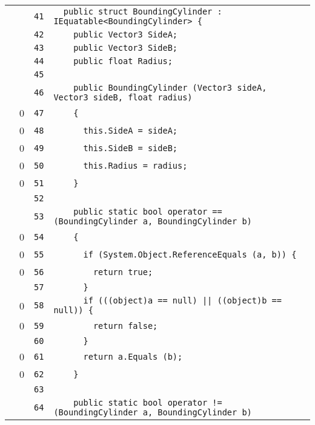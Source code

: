 \documentclass[a4paper,10pt]{article}
\begin{document}
\begin{longtable}[l]{lrrl}
\cellcolor{gray} &  & \verb~41~ & \verb~  public struct BoundingCylinder : IEquatable<BoundingCylinder> {~\\
\cellcolor{gray} &  & \verb~42~ & \verb~    public Vector3 SideA;~\\
\cellcolor{gray} &  & \verb~43~ & \verb~    public Vector3 SideB;~\\
\cellcolor{gray} &  & \verb~44~ & \verb~    public float Radius;~\\
\cellcolor{gray} &  & \verb~45~ & \verb~~\\
\cellcolor{gray} &  & \verb~46~ & \verb~    public BoundingCylinder (Vector3 sideA, Vector3 sideB, float radius)~\\
\cellcolor{red} & 0 & \verb~47~ & \verb~    {~\\
\cellcolor{red} & 0 & \verb~48~ & \verb~      this.SideA = sideA;~\\
\cellcolor{red} & 0 & \verb~49~ & \verb~      this.SideB = sideB;~\\
\cellcolor{red} & 0 & \verb~50~ & \verb~      this.Radius = radius;~\\
\cellcolor{red} & 0 & \verb~51~ & \verb~    }~\\
\cellcolor{gray} &  & \verb~52~ & \verb~~\\
\cellcolor{gray} &  & \verb~53~ & \verb~    public static bool operator == (BoundingCylinder a, BoundingCylinder b)~\\
\cellcolor{red} & 0 & \verb~54~ & \verb~    {~\\
\cellcolor{red} & 0 & \verb~55~ & \verb~      if (System.Object.ReferenceEquals (a, b)) {~\\
\cellcolor{red} & 0 & \verb~56~ & \verb~        return true;~\\
\cellcolor{gray} &  & \verb~57~ & \verb~      }~\\
\cellcolor{red} & 0 & \verb~58~ & \verb~      if (((object)a == null) || ((object)b == null)) {~\\
\cellcolor{red} & 0 & \verb~59~ & \verb~        return false;~\\
\cellcolor{gray} &  & \verb~60~ & \verb~      }~\\
\cellcolor{red} & 0 & \verb~61~ & \verb~      return a.Equals (b);~\\
\cellcolor{red} & 0 & \verb~62~ & \verb~    }~\\
\cellcolor{gray} &  & \verb~63~ & \verb~~\\
\cellcolor{gray} &  & \verb~64~ & \verb~    public static bool operator != (BoundingCylinder a, BoundingCylinder b)~\\

\end{longtable}
\end{document}
